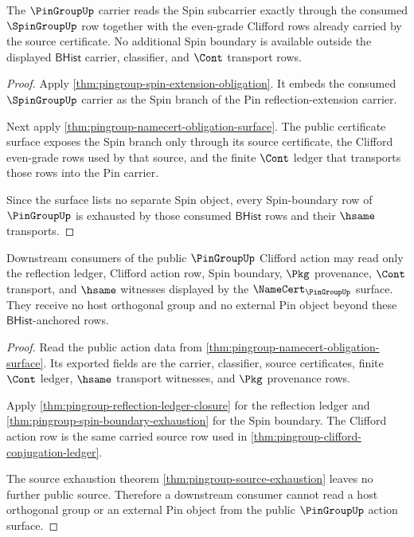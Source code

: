 \begin{theorem}
\label{thm:pingroup-spin-boundary-exhaustion}
The $\PinGroupUp$ carrier reads the Spin subcarrier exactly through the
consumed $\SpinGroupUp$ row together with the even-grade Clifford rows already
carried by the source certificate. No additional Spin boundary is available
outside the displayed $\mathsf{BHist}$ carrier, classifier, and $\Cont$
transport rows.
\end{theorem}
\begin{proof}
Apply \autoref{thm:pingroup-spin-extension-obligation}. It embeds the consumed
$\SpinGroupUp$ carrier as the Spin branch of the Pin reflection-extension
carrier.

Next apply \autoref{thm:pingroup-namecert-obligation-surface}. The public
certificate surface exposes the Spin branch only through its source
certificate, the Clifford even-grade rows used by that source, and the finite
$\Cont$ ledger that transports those rows into the Pin carrier.

Since the surface lists no separate Spin object, every Spin-boundary row of
$\PinGroupUp$ is exhausted by those consumed $\mathsf{BHist}$ rows and their
$\hsame$ transports.
\end{proof}

\begin{theorem}
\label{thm:pingroup-clifford-action-consumer-surface}
Downstream consumers of the public $\PinGroupUp$ Clifford action may read only
the reflection ledger, Clifford action row, Spin boundary, $\Pkg$ provenance,
$\Cont$ transport, and $\hsame$ witnesses displayed by the
$\NameCert_{\PinGroupUp}$ surface. They receive no host orthogonal group and no
external Pin object beyond these $\mathsf{BHist}$-anchored rows.
\end{theorem}
\begin{proof}
Read the public action data from
\autoref{thm:pingroup-namecert-obligation-surface}. Its exported fields are the
carrier, classifier, source certificates, finite $\Cont$ ledger, $\hsame$
transport witnesses, and $\Pkg$ provenance rows.

Apply \autoref{thm:pingroup-reflection-ledger-closure} for the reflection
ledger and \autoref{thm:pingroup-spin-boundary-exhaustion} for the Spin
boundary. The Clifford action row is the same carried source row used in
\autoref{thm:pingroup-clifford-conjugation-ledger}.

The source exhaustion theorem
\autoref{thm:pingroup-source-exhaustion} leaves no further public source.
Therefore a downstream consumer cannot read a host orthogonal group or an
external Pin object from the public $\PinGroupUp$ action surface.
\end{proof}

